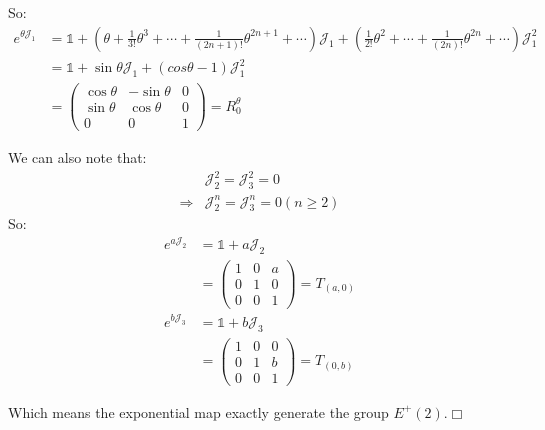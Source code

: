 \documentclass[]{ctexart}
\begin{document}
		So:
			\begin{equation*}
			\begin{aligned}
				e^{\theta\mathcal{J}_1}&=\mathds{1}+(\theta+\frac{1}{3!}\theta^3+\cdots+\frac{1}{(2n+1)!}\theta^{2n+1}+\cdots)\mathcal{J}_1+(\frac{1}{2!}\theta^2+\cdots+\frac{1}{(2n)!}\theta^{2n}+\cdots)\mathcal{J}_1^2\\
				&=\mathds{1}+\sin \theta\mathcal{J}_1+(cos\theta -1) \mathcal{J}_1^2\\
				&=
				\begin{pmatrix}
				\cos \theta & -\sin \theta & 0\\
				\sin \theta & \cos \theta & 0\\
				0 & 0 & 1
				\end{pmatrix}=R^{\theta}_0
			\end{aligned}
			\end{equation*}
	
		We can also note that:
			\begin{equation*}
			\begin{aligned}
			&\mathcal{J}_2^2=\mathcal{J}_3^2=0\\
			\Rightarrow 
			&\mathcal{J}_2^{n}=\mathcal{J}_3^{n}=0(n\geq2)
			\end{aligned}
			\end{equation*}
		So:
			\begin{equation*}
			\begin{aligned}
				e^{a\mathcal{J}_2}&=\mathds{1}+a\mathcal{J}_2\\
				&=
				\begin{pmatrix}
				1 & 0 & a\\
				0 & 1 & 0\\
				0 & 0 & 1
				\end{pmatrix}=T_{(a,0)}\\
				e^{b\mathcal{J}_3}&=\mathds{1}+b\mathcal{J}_3\\
				&=
				\begin{pmatrix}
				1 & 0 & 0\\
				0 & 1 & b\\
				0 & 0 & 1
				\end{pmatrix}=T_{(0,b)}
			\end{aligned}
			\end{equation*}
			
		Which means the exponential map exactly generate the group $E^+(2)$.$\Box$
		
\end{document}

